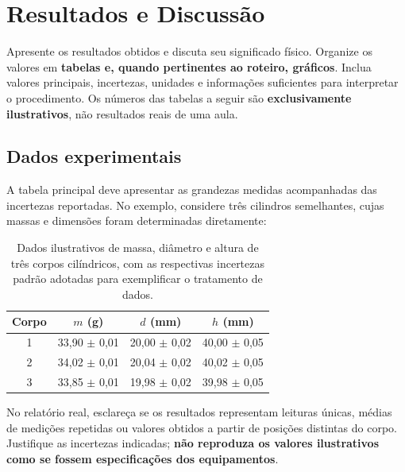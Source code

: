 \documentclass[aps,prb,12pt,onecolumn,amsmath,amssymb]{revtex4-2}
\begin{document}
\section{Resultados e Discussão}
Apresente os resultados obtidos e discuta seu significado físico. Organize os valores em \textbf{tabelas e, quando pertinentes ao roteiro, gráficos}. Inclua valores principais, incertezas, unidades e informações suficientes para interpretar o procedimento. Os números das tabelas a seguir são \textbf{exclusivamente ilustrativos}, não resultados reais de uma aula.

\subsection{Dados experimentais}
A tabela principal deve apresentar as grandezas medidas acompanhadas das incertezas reportadas. No exemplo, considere três cilindros semelhantes, cujas massas e dimensões foram determinadas diretamente:
\begin{table}[ht]
    \centering
    \begin{tabular}{cccc}
        \toprule
        Corpo & $m$ (g) & $d$ (mm) & $h$ (mm) \\
        \midrule
        1 & 33,90 $\pm$ 0,01 & 20,00 $\pm$ 0,02 & 40,00 $\pm$ 0,05 \\
        2 & 34,02 $\pm$ 0,01 & 20,04 $\pm$ 0,02 & 40,02 $\pm$ 0,05 \\
        3 & 33,85 $\pm$ 0,01 & 19,98 $\pm$ 0,02 & 39,98 $\pm$ 0,05 \\
        \bottomrule
    \end{tabular}
    \caption{Dados ilustrativos de massa, diâmetro e altura de três corpos cilíndricos, com as respectivas incertezas padrão adotadas para exemplificar o tratamento de dados.}
    \label{tab:dados}
\end{table}

No relatório real, esclareça se os resultados representam leituras únicas, médias de medições repetidas ou valores obtidos a partir de posições distintas do corpo. Justifique as incertezas indicadas; \textbf{não reproduza os valores ilustrativos como se fossem especificações dos equipamentos}.

\end{document}
